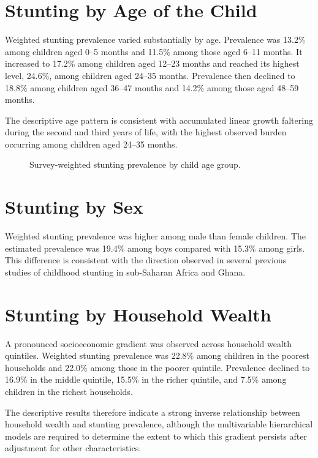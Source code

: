 \section{Stunting by Age of the Child}

Weighted stunting prevalence varied substantially by age. Prevalence was 13.2\% among children aged 0--5 months and 11.5\% among those aged 6--11 months. It increased to 17.2\% among children aged 12--23 months and reached its highest level, 24.6\%, among children aged 24--35 months. Prevalence then declined to 18.8\% among children aged 36--47 months and 14.2\% among those aged 48--59 months.

The descriptive age pattern is consistent with accumulated linear growth faltering during the second and third years of life, with the highest observed burden occurring among children aged 24--35 months.


\begin{figure}[H]
\centering

\caption{Survey-weighted stunting prevalence by child age group.}
\label{fig:stunting_age}
\end{figure}

\section{Stunting by Sex}

Weighted stunting prevalence was higher among male than female children. The estimated prevalence was 19.4\% among boys compared with 15.3\% among girls. This difference is consistent with the direction observed in several previous studies of childhood stunting in sub-Saharan Africa and Ghana.

\section{Stunting by Household Wealth}

A pronounced socioeconomic gradient was observed across household wealth quintiles. Weighted stunting prevalence was 22.8\% among children in the poorest households and 22.0\% among those in the poorer quintile. Prevalence declined to 16.9\% in the middle quintile, 15.5\% in the richer quintile, and 7.5\% among children in the richest households.

The descriptive results therefore indicate a strong inverse relationship between household wealth and stunting prevalence, although the multivariable hierarchical models are required to determine the extent to which this gradient persists after adjustment for other characteristics.


